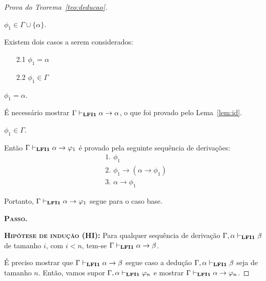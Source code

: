 \begin{proof}[Prova do Teorema~\ref{teo:deducao}]
\begin{provaporcasos}
                    \casodeprova{} $\phi_{1} \in \Gamma \cup \{\alpha\}$. 
                    
                    Existem dois casos a serem considerados:

                    \begin{enumerate}
                        \item[2.1] $\phi_{1} = \alpha$
                        \item[2.2] $\phi_{1} \in \Gamma$
                    \end{enumerate}

                    \begin{provaporsubcasos}
                        \subcasodeprova{} $\phi_{1} = \alpha$. 
                        
                            É necessário mostrar $\Gamma \vdash_{{\normalfont\textbf{LFI1}}{}} \alpha \to \alpha$, o que foi provado pelo Lema~\ref{lem:id}.

                        \subcasodeprova{} $\phi_{1} \in \Gamma$.
                        
                            Então $\Gamma \vdash_{{\normalfont\textbf{LFI1}}{}} \alpha \to \varphi_{1}$ é provado pela seguinte sequência de derivações:
                            \begin{align*}
                                & \text{1. } \phi_{1} \tag{Premissa}\\
                                & \text{2. } \phi_{1} \to (\alpha \to \phi_{1}) \tag{Ax1}\\
                                & \text{3. } \alpha \to \phi_{1} \tag{MP 1, 2}
                            \end{align*}
                    \end{provaporsubcasos}
                    
                \end{provaporcasos}
                
                Portanto, $\Gamma \vdash_{{\normalfont\textbf{LFI1}}{}} \alpha \to \varphi_{1}$ segue para o caso base.


            \noindent \textbf{\textsc{Passo.}}

            \noindent \textbf{\textsc{Hipótese de indução (HI):}} Para qualquer sequência de derivação $\Gamma, \alpha \vdash_{{\normalfont\textbf{LFI1}}{}} \beta$ de tamanho $i$, com $i < n$, tem-se $\Gamma \vdash_{{\normalfont\textbf{LFI1}}{}} \alpha \to \beta$. 

            É preciso mostrar que $\Gamma \vdash_{{\normalfont\textbf{LFI1}}{}} \alpha \to \beta$ segue caso a dedução $\Gamma, \alpha \vdash_{{\normalfont\textbf{LFI1}}{}} \beta$ seja de tamanho $n$. Então, vamos supor $\Gamma, \alpha \vdash_{{\normalfont\textbf{LFI1}}{}} \varphi_{n}$ e mostrar $\Gamma \vdash_{{\normalfont\textbf{LFI1}}{}} \alpha \to \varphi_{n}$.
            

\end{proof}

